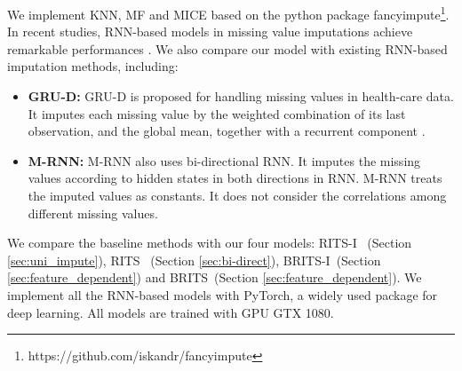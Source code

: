 \documentclass{article}
\newcommand{\ritsi}{\xspace{RITS-I}}
\newcommand{\britsi}{\xspace{BRITS-I}}
\newcommand{\rits}{\xspace{RITS}}
\newcommand{\brits}{\xspace{BRITS}}
\begin{document}
We implement KNN, MF and MICE based on the python package fancyimpute\footnote{https://github.com/iskandr/fancyimpute}. In recent studies, RNN-based models in missing value imputations achieve remarkable performances \cite{che2018recurrent,lipton2016directly,choi2016doctor,yoon2017multi}. We also compare our model with existing RNN-based imputation methods, including:
\begin{itemize}
\item {\bf GRU-D:} GRU-D is proposed for handling missing values in health-care data. It imputes each missing value by the weighted combination of its last observation, and the global mean, together with a recurrent component \cite{che2018recurrent}.

\item {\bf M-RNN:} M-RNN also uses bi-directional RNN. It imputes the missing values according to hidden states in both directions in RNN. M-RNN treats the imputed values as constants. It does not consider the correlations among different missing values\cite{yoon2017multi}.
\end{itemize}
We compare the baseline methods with our four models: \ritsi~ (Section \ref{sec:uni_impute}), \rits~ (Section \ref{sec:bi-direct}), \britsi~(Section \ref{sec:feature_dependent}) and \brits~(Section \ref{sec:feature_dependent}).
We implement all the RNN-based models with PyTorch, a widely used package for deep learning. All models are trained with GPU GTX 1080.
\end{document}
